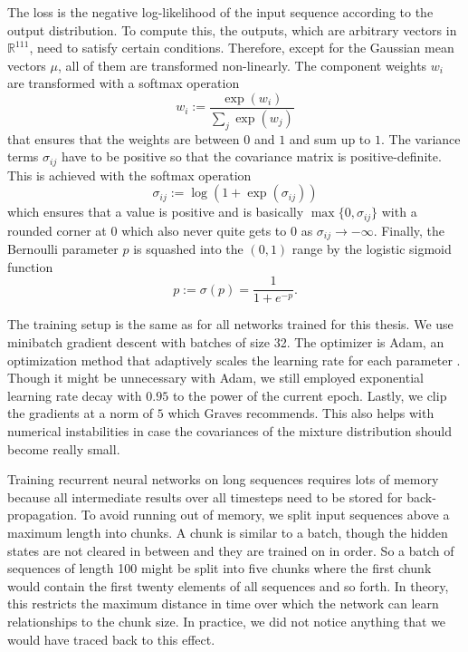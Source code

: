 The loss is the negative log-likelihood of the input sequence according to the
output distribution. To compute this, the outputs, which are arbitrary vectors in
$\mathbb{R}^{111}$, need to satisfy certain conditions. Therefore, except for the
Gaussian mean vectors $\mu$, all of them are transformed non-linearly. The
component weights $w_{i}$ are transformed with a softmax operation
\begin{equation*}
  w_{i} := \frac{\exp(w_{i})}{\sum_{j} \exp(w_{j})}
\end{equation*}
that ensures that the weights are between $0$ and $1$ and sum up to $1$. The
variance terms $\sigma_{ij}$ have to be positive so that the covariance matrix
is positive-definite. This is achieved with the softmax operation
\begin{equation*}
  \sigma_{ij} := \log\left( 1 + \exp(\sigma_{ij}) \right)
\end{equation*}
which ensures that a value is positive and is basically $\max\{ 0, \sigma_{ij}
\}$ with a rounded corner at $0$ which also never quite gets to $0$ as
$\sigma_{ij} \rightarrow -\infty$. Finally, the Bernoulli parameter $p$ is
squashed into the $(0, 1)$ range by the logistic sigmoid function
\begin{equation*}
  p := \sigma(p) = \frac{1}{1 + e^{-p}}.
\end{equation*}

The training setup is the same as for all networks trained for this thesis. We
use minibatch gradient descent with batches of size 32. The optimizer is Adam,
an optimization method that adaptively scales the learning rate for each
parameter \cite{adam}. Though it might be unnecessary with Adam, we still
employed exponential learning rate decay with $0.95$ to the power of the current
epoch. Lastly, we clip the gradients at a norm of $5$ which Graves recommends.
This also helps with numerical instabilities in case the covariances of the
mixture distribution should become really small.

Training recurrent neural networks on long sequences requires lots of memory
because all intermediate results over all timesteps need to be stored for
back-propagation. To avoid running out of memory, we split input sequences above
a maximum length into chunks. A chunk is similar to a batch, though the hidden
states are not cleared in between and they are trained on in order. So a batch
of sequences of length 100 might be split into five chunks where the first chunk
would contain the first twenty elements of all sequences and so forth. In
theory, this restricts the maximum distance in time over which the network can
learn relationships to the chunk size. In practice, we did not notice anything
that we would have traced back to this effect.

